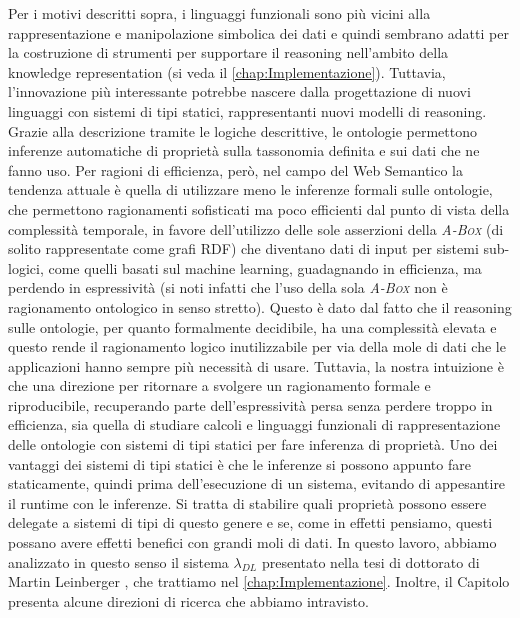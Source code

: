 Per i motivi descritti sopra, i linguaggi funzionali sono più vicini alla rappresentazione e manipolazione simbolica dei dati e quindi sembrano adatti per la costruzione di strumenti per supportare il reasoning nell'ambito della knowledge representation (si veda il \autoref{chap:Implementazione}).
Tuttavia, l'innovazione più interessante potrebbe nascere dalla progettazione di nuovi linguaggi con sistemi di tipi statici, rappresentanti nuovi modelli di reasoning. Grazie alla descrizione tramite le logiche descrittive, le ontologie permettono inferenze automatiche di proprietà sulla tassonomia definita e sui dati che ne fanno uso. Per ragioni di efficienza, però, nel campo del Web Semantico la tendenza attuale è quella di utilizzare meno le inferenze formali sulle ontologie, che permettono ragionamenti sofisticati ma poco efficienti dal punto di vista della complessità temporale, in favore dell'utilizzo delle sole asserzioni della \textsc{\itshape A-Box} (di solito rappresentate come grafi RDF) che diventano dati di input per sistemi sub-logici, come quelli basati sul machine learning, guadagnando in efficienza, ma perdendo in espressività (si noti infatti che l'uso della sola \textsc{\itshape A-Box} non è ragionamento ontologico in senso stretto). 
Questo è dato dal fatto che il reasoning sulle ontologie, per quanto formalmente decidibile, ha una complessità elevata \cite{baader2017introductionDL} e questo rende il ragionamento logico inutilizzabile per via della mole di dati che le applicazioni hanno sempre più necessità di usare. Tuttavia, la nostra intuizione è che una direzione per ritornare a svolgere un ragionamento formale e riproducibile, recuperando parte dell'espressività persa senza perdere troppo in efficienza, sia quella di studiare calcoli e linguaggi funzionali di rappresentazione delle ontologie con sistemi di tipi statici per fare inferenza di proprietà. Uno dei vantaggi dei sistemi di tipi statici è che le inferenze si possono appunto fare staticamente, quindi prima dell'esecuzione di un sistema, evitando di appesantire il runtime con le inferenze. Si tratta di stabilire quali proprietà possono essere delegate a sistemi di tipi di questo genere e se, come in effetti pensiamo, questi possano avere effetti benefici con grandi moli di dati. In questo lavoro, abbiamo analizzato in questo senso il sistema $\lambda_{DL}$ presentato nella tesi di dottorato di Martin Leinberger \cite{leinbergerphdthesis}, che trattiamo nel \autoref{chap:Implementazione}. Inoltre, il Capitolo %
presenta alcune direzioni di ricerca che abbiamo intravisto.

